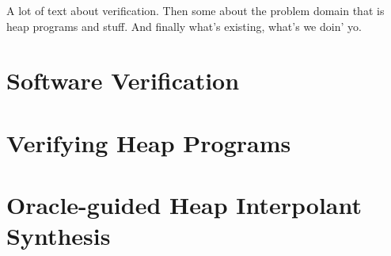 \label{ch:intro}

A lot of text about verification. Then some about the problem domain that is heap programs and stuff. And finally what's existing, what's we doin' yo.

\section{Software Verification}

\section{Verifying Heap Programs}

\section{Oracle-guided Heap Interpolant Synthesis}